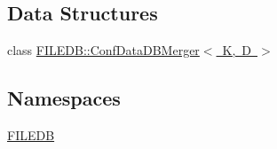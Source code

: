 \subsection*{Data Structures}
\begin{DoxyCompactItemize}
\item 
class \mbox{\hyperlink{classFILEDB_1_1ConfDataDBMerger}{F\+I\+L\+E\+D\+B\+::\+Conf\+Data\+D\+B\+Merger$<$ K, D $>$}}
\end{DoxyCompactItemize}
\subsection*{Namespaces}
\begin{DoxyCompactItemize}
\item 
 \mbox{\hyperlink{namespaceFILEDB}{F\+I\+L\+E\+DB}}
\end{DoxyCompactItemize}
